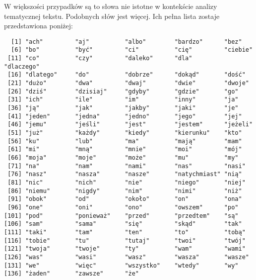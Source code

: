 \documentclass[12pt, twoside, openany]{report}
\theoremstyle{plain}
\begin{document}
W większości przypadków są to słowa nie istotne w kontekście analizy tematycznej tekstu. Podobnych słów jest więcej. Ich pełna lista zostaje przedstawiona poniżej:
\begin{knitrout}
\color{fgcolor}\begin{kframe}
\begin{verbatim}
  [1] "ach"         "aj"          "albo"        "bardzo"      "bez"        
  [6] "bo"          "być"         "ci"          "cię"         "ciebie"     
 [11] "co"          "czy"         "daleko"      "dla"         "dlaczego"   
 [16] "dlatego"     "do"          "dobrze"      "dokąd"       "dość"       
 [21] "dużo"        "dwa"         "dwaj"        "dwie"        "dwoje"      
 [26] "dziś"        "dzisiaj"     "gdyby"       "gdzie"       "go"         
 [31] "ich"         "ile"         "im"          "inny"        "ja"         
 [36] "ją"          "jak"         "jakby"       "jaki"        "je"         
 [41] "jeden"       "jedna"       "jedno"       "jego"        "jej"        
 [46] "jemu"        "jeśli"       "jest"        "jestem"      "jeżeli"     
 [51] "już"         "każdy"       "kiedy"       "kierunku"    "kto"        
 [56] "ku"          "lub"         "ma"          "mają"        "mam"        
 [61] "mi"          "mną"         "mnie"        "moi"         "mój"        
 [66] "moja"        "moje"        "może"        "mu"          "my"         
 [71] "na"          "nam"         "nami"        "nas"         "nasi"       
 [76] "nasz"        "nasza"       "nasze"       "natychmiast" "nią"        
 [81] "nic"         "nich"        "nie"         "niego"       "niej"       
 [86] "niemu"       "nigdy"       "nim"         "nimi"        "niż"        
 [91] "obok"        "od"          "około"       "on"          "ona"        
 [96] "one"         "oni"         "ono"         "owszem"      "po"         
[101] "pod"         "ponieważ"    "przed"       "przedtem"    "są"         
[106] "sam"         "sama"        "się"         "skąd"        "tak"        
[111] "taki"        "tam"         "ten"         "to"          "tobą"       
[116] "tobie"       "tu"          "tutaj"       "twoi"        "twój"       
[121] "twoja"       "twoje"       "ty"          "wam"         "wami"       
[126] "was"         "wasi"        "wasz"        "wasza"       "wasze"      
[131] "we"          "więc"        "wszystko"    "wtedy"       "wy"         
[136] "żaden"       "zawsze"      "że"         
\end{verbatim}
\end{kframe}
\end{knitrout}
\end{document}
